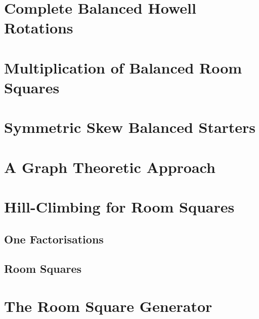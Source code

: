 \documentclass[a4paper, draft]{book}
\begin{document}
\chapter{Complete Balanced Howell Rotations}
  \label{ch:cbhr}
  
  

\chapter{Multiplication of Balanced Room Squares}
  \label{ch:brs-multiplication}
  

\chapter{Symmetric Skew Balanced Starters}
  \label{ch:symmetric-skew-balanced-starters}
  

\chapter{A Graph Theoretic Approach}
  \label{ch:graph-theoretic}
  

\chapter{Hill-Climbing for Room Squares}
  \label{ch:hill-climbing}
  
  \section{One Factorisations}
  
  \section{Room Squares}
  

\appendix
\chapter{The Room Square Generator}
  \label{ch:room-square-generator}
  

\backmatter
\printbibliography[title=References]

\printindex
\end{document}
